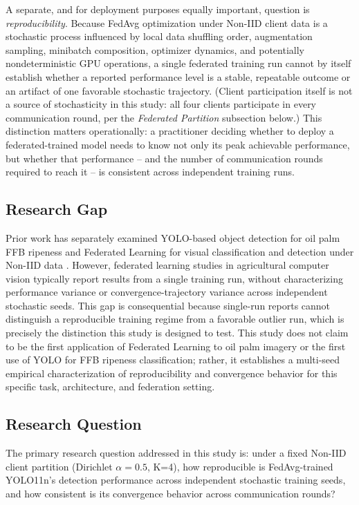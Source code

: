 \documentclass[11pt]{article}
\begin{document}
A separate, and for deployment purposes equally important, question is \emph{reproducibility}. Because FedAvg optimization under Non-IID client data is a stochastic process influenced by local data shuffling order, augmentation sampling, minibatch composition, optimizer dynamics, and potentially nondeterministic GPU operations, a single federated training run cannot by itself establish whether a reported performance level is a stable, repeatable outcome or an artifact of one favorable stochastic trajectory. (Client participation itself is not a source of stochasticity in this study: all four clients participate in every communication round, per the \emph{Federated Partition} subsection below.) This distinction matters operationally: a practitioner deciding whether to deploy a federated-trained model needs to know not only its peak achievable performance, but whether that performance -- and the number of communication rounds required to reach it -- is consistent across independent training runs.

\subsection*{Research Gap}
Prior work has separately examined YOLO-based object detection for oil palm FFB ripeness \cite{lai2022,suharjito2021,suharjito2023dataset,asrol2023,goh2025} and Federated Learning for visual classification and detection under Non-IID data \cite{mcmahan2017fedavg,hsu2019,kairouz2021}. However, federated learning studies in agricultural computer vision typically report results from a single training run, without characterizing performance variance or convergence-trajectory variance across independent stochastic seeds. This gap is consequential because single-run reports cannot distinguish a reproducible training regime from a favorable outlier run, which is precisely the distinction this study is designed to test. This study does not claim to be the first application of Federated Learning to oil palm imagery or the first use of YOLO for FFB ripeness classification; rather, it establishes a multi-seed empirical characterization of reproducibility and convergence behavior for this specific task, architecture, and federation setting.

\subsection*{Research Question}
The primary research question addressed in this study is: under a fixed Non-IID client partition (Dirichlet $\alpha=0.5$, K=4), how reproducible is FedAvg-trained YOLO11n's detection performance across independent stochastic training seeds, and how consistent is its convergence behavior across communication rounds?
\end{document}
